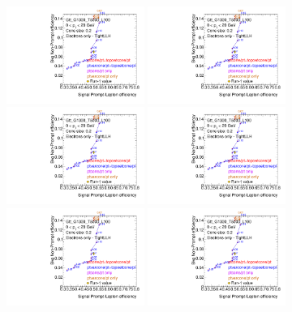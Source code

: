 \begin{figure}[phtb!]
\begin{center}
\includegraphics[page=1,width=0.4\textwidth]{FIGURES/ISOLATION/isoEl.pdf}
\includegraphics[page=2,width=0.4\textwidth]{FIGURES/ISOLATION/isoEl.pdf}
\includegraphics[page=3,width=0.4\textwidth]{FIGURES/ISOLATION/isoEl.pdf}
\includegraphics[page=4,width=0.4\textwidth]{FIGURES/ISOLATION/isoEl.pdf}
\includegraphics[page=5,width=0.4\textwidth]{FIGURES/ISOLATION/isoEl.pdf}
\includegraphics[page=6,width=0.4\textwidth]{FIGURES/ISOLATION/isoEl.pdf}

\end{center}
\end{figure}
